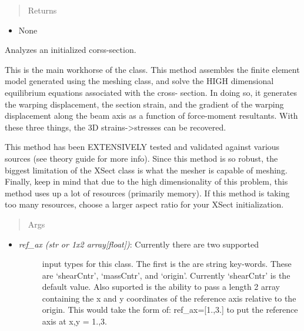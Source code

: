 \documentclass[letterpaper,10pt,english]{sphinxmanual}
\begin{document}
\begin{fulllineitems}
\begin{fulllineitems}
\begin{itemize}
\end{itemize}
\begin{quote}\begin{description}
\item[{Returns}] \leavevmode
\end{description}\end{quote}
\begin{itemize}
\item {} 
None

\end{itemize}

\end{fulllineitems}


\begin{fulllineitems}
\label{structures:AeroComBAT.Structures.XSect.xSectionAnalysis}
Analyzes an initialized corss-section.

This is the main workhorse of the class. This method assembles the
finite element model generated using the meshing class, and solve the
HIGH dimensional equilibrium equations associated with the cross-
section. In doing so, it generates the warping displacement, the
section strain, and the gradient of the warping displacement along the
beam axis as a function of force-moment resultants. With these three
things, the 3D strains-\textgreater{}stresses can be recovered.

This method has been EXTENSIVELY tested and validated against
various sources (see theory guide for more info). Since this method
is so robust, the biggest limitation of the XSect class is what the
mesher is capable of meshing. Finally, keep in mind that due to the
high dimensionality of this problem, this method uses up a lot of
resources (primarily memory). If this method is taking too many
resources, choose a larger aspect ratio for your XSect initialization.
\begin{quote}\begin{description}
\item[{Args}] \leavevmode
\end{description}\end{quote}
\begin{itemize}
\item {} \begin{description}
\item[{\emph{ref\_ax (str or 1x2 array{[}float{]})}: Currently there are two supported}] \leavevmode
input types for this class. The first is the are string key-words.
These are `shearCntr', `massCntr', and `origin'. Currently
`shearCntr' is the default value. Also suported is the ability to
pass a length 2 array containing the x and y coordinates of the
reference axis relative to the origin. This would take the form of:
ref\_ax={[}1.,3.{]} to put the reference axis at x,y = 1.,3.


\end{description}
\end{itemize}
\end{fulllineitems}
\end{fulllineitems}
\end{document}
